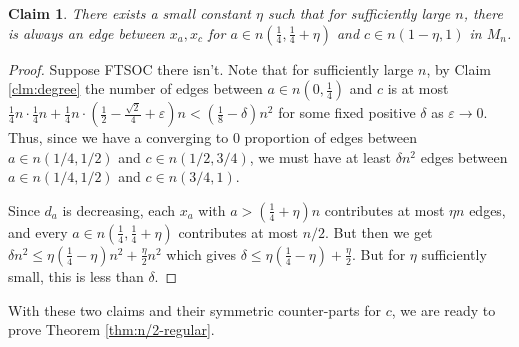 \documentclass[11pt]{article}
\newtheorem{clm}[thm]{Claim}
\begin{document}
\begin{clm}\label{clm:small-box}
    There exists a small constant $\eta$ such that for sufficiently large $n$, there is always an edge between $x_a, x_c$ for $a \in n(\frac14, \frac14 + \eta)$ and $c \in n(1-\eta, 1)$ in $M_n$. 
\end{clm}
\begin{proof}
    Suppose FTSOC there isn't. Note that for sufficiently large $n$, by Claim \ref{clm:degree} the number of edges between $a \in n(0, \frac14)$ and $c$ is at most $\frac14n \cdot \frac14n + \frac14n \cdot (\frac12 - \frac{\sqrt{2}}{4} + \varepsilon)n < (\frac18 - \delta)n^2$ for some fixed positive $\delta$ as $\varepsilon \to 0$. Thus, since we have a converging to 0 proportion of edges between $a \in n(1/4, 1/2)$ and $c \in n(1/2, 3/4)$, we must have at least $\delta n^2$ edges between $a \in n(1/4, 1/2)$ and $c \in n(3/4, 1)$. 
    
    Since $d_a$ is decreasing, each $x_a$ with $a > (\frac14 + \eta)n$ contributes at most $\eta n$ edges, and every $a \in n(\frac14, \frac14 + \eta)$ contributes at most $n/2$. But then we get $\delta n^2 \le \eta(\frac14 - \eta) n^2 + \frac{\eta}{2} n^2$ which gives $\delta \le \eta(\frac14 - \eta) + \frac{\eta}{2}$. But for $\eta$ sufficiently small, this is less than $\delta$.
\end{proof}

With these two claims and their symmetric counter-parts for $c$, we are ready to prove Theorem \ref{thm:n/2-regular}.
\end{document}
